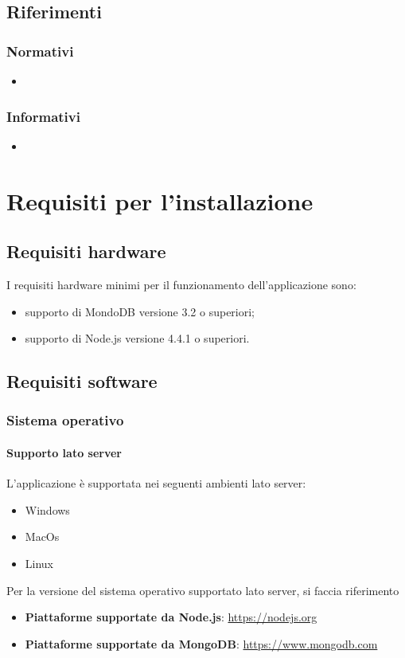 \documentclass[12pt,a4paper]{article}
\begin{document}
	\subsection{Riferimenti}
	
	\subsubsection{Normativi}
	\begin{itemize}
		\item
		
	\end{itemize}
	
	\subsubsection{Informativi}
	\begin{itemize}
		\item 
	\end{itemize}
	
	\newpage
	\section{Requisiti per l'installazione}\label{requisiti}
	\subsection{Requisiti hardware}\label{requisitiHW}
	I requisiti hardware minimi per il funzionamento dell'applicazione sono:
	\begin{itemize}
		\item supporto di MondoDB versione 3.2 o superiori;
		\item supporto di Node.js versione 4.4.1 o superiori.
	\end{itemize}
	\subsection{Requisiti software}\label{requisitiSW}
	\subsubsection{Sistema operativo}
	\paragraph{Supporto lato server}L'applicazione \prj{} è supportata nei seguenti ambienti lato server:
	\begin{itemize}
		\item Windows 
		\item MacOs
		\item Linux
	\end{itemize}
	Per la versione del sistema operativo supportato lato server, si faccia riferimento 
	\begin{itemize}
		\item \textbf{Piattaforme supportate da Node.js}: \url{https://nodejs.org} 
		\item \textbf{Piattaforme supportate da MongoDB}: \url{https://www.mongodb.com}
	\end{itemize}
\end{document}
